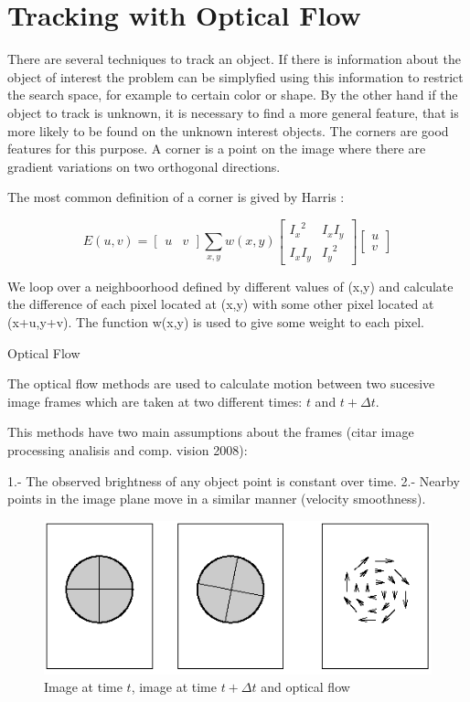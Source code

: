  

\section{Tracking with Optical Flow}

There are several techniques to track an object. If there is information about the object of interest the problem 
can be simplyfied using this information to restrict the search space, for example to certain color or shape.
 By the other hand if the object to track is unknown, it is necessary to find a more general feature, that is 
more likely to be found on the unknown interest objects. The corners are good features for this purpose. A corner 
is a point on the image where there are gradient variations on two orthogonal directions.

The most common definition of a corner is gived by Harris :

$$
E(u,v) = \begin{bmatrix} u & v \end{bmatrix} \sum\limits_{x,y} w(x,y) \begin{bmatrix} {I_x}^2 & I_x I_y \\ I_x I_y & {I_y}^2 \end{bmatrix} \begin{bmatrix} u \\ v \end{bmatrix}
$$

We loop over a neighboorhood defined by different values of (x,y) and calculate 
the difference of each pixel located at (x,y) with some other pixel located at (x+u,y+v). 
The function w(x,y) is used to give some weight to each pixel. 


Optical Flow

The optical flow methods are used to calculate motion between two sucesive image frames which are taken
 at two different times: $t$ and $t + \Delta t$.

This methods have two main assumptions about the frames (citar image processing analisis and comp. vision 2008):

1.- The observed brightness of any object point is constant over time.
2.- Nearby points in the image plane move in a similar manner (velocity smoothness).

\begin{figure}[h!]
\begin{center}
\includegraphics[scale=0.6]{images/oflow}
\caption{Image at time $t$, image at time $t + \Delta t$ and optical flow}
\label{fig:oflow}
\end{center}
\end{figure}

